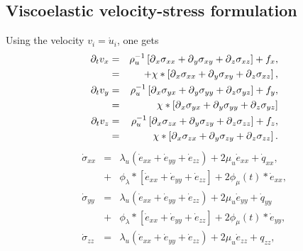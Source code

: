 \documentclass[11pt]{article}
\begin{document}
{\subsection*{Viscoelastic velocity-stress formulation} 
Using the velocity $v_i = \dot{u}_i$, one gets
\begin{eqnarray}
  \partial_t{v}_x & = & \rho^{-1}_u\left[\mbox{$\partial$}_x \sigma_{xx} +\mbox{$\partial$}_y \sigma_{xy} 
                                    +\mbox{$\partial$}_z \sigma_{xz}\right] + f_x, \nonumber\\
            & = & + \chi*\left[\mbox{$\partial$}_x \sigma_{xx} +\mbox{$\partial$}_y \sigma_{xy} 
                                    +\mbox{$\partial$}_z \sigma_{xz}\right],       \nonumber\\
  \partial_t{v}_y & = & \rho^{-1}_u\left[\mbox{$\partial$}_x \sigma_{yx} +\mbox{$\partial$}_y \sigma_{yy} 
                                    +\mbox{$\partial$}_z \sigma_{yz}\right] + f_y, \nonumber\\
            & = & \chi*\left[\mbox{$\partial$}_x \sigma_{yx} +\mbox{$\partial$}_y \sigma_{yy} 
                                    +\mbox{$\partial$}_z \sigma_{yz}\right]        \nonumber\\
  \partial_t{v}_z & = & \rho^{-1}_u\left[\mbox{$\partial$}_x \sigma_{zx} +\mbox{$\partial$}_y \sigma_{zy} 
                                    +\mbox{$\partial$}_z \sigma_{zz}\right] + f_z, \nonumber\\
            & = & \chi*\left[\mbox{$\partial$}_x \sigma_{zx} +\mbox{$\partial$}_y \sigma_{zy} 
                                    +\mbox{$\partial$}_z \sigma_{zz}\right].
\end{eqnarray}
\begin{eqnarray}
  \dot{\sigma}_{xx} 
     & = & \lambda_u \left (\dot{e}_{xx} 
                 + \dot{e}_{yy} + \dot{e}_{zz}\right)
                 + 2\mu_u \dot{e}_{xx} +\dot{q}_{xx},          \nonumber\\ 
     & + & \phi_{\lambda}*[\dot{e}_{xx}+\dot{e}_{yy}
                 +\dot{e}_{zz}] + 2\phi_{\mu}(t)*\dot{e}_{xx}, \nonumber\\
  \dot{\sigma}_{yy} 
     & = & \lambda_u \left (\dot{e}_{xx} 
                 +\dot{e}_{yy} + \dot{e}_{zz}\right)
                 + 2\mu_u \dot{e}_{yy} +\dot{q}_{yy}           \nonumber\\
     & + & \phi_{\lambda}*[\dot{e}_{xx}+\dot{e}_{yy}
                 +\dot{e}_{zz}] + 2\phi_{\mu}(t)*\dot{e}_{yy}, \nonumber\\
  \dot{\sigma}_{zz} 
    & = & \lambda_u \left (\dot{e}_{xx} 
                + \dot{e}_{yy} + \dot{e}_{zz}\right)
                + 2\mu_u \dot{e}_{zz} +q_{zz},                 \nonumber\\

\end{eqnarray}}
\end{document}
